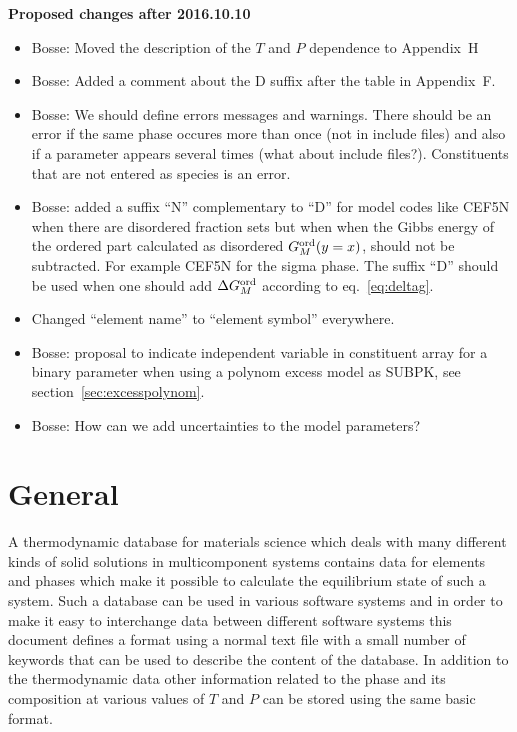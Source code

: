 \documentclass[12pt]{article}
\begin{document}
{\Large \bf Proposed changes after 2016.10.10}
\begin{itemize}
\item Bosse: Moved the description of the $T$ and $P$ dependence to
  Appendix~H
\item Bosse: Added a comment about the D suffix after the table in
  Appendix~F.
\item Bosse: We should define errors messages and warnings.  There
  should be an error if the same phase occures more than once (not in
  include files) and also if a parameter appears several times (what
  about include files?).  Constituents that are not entered as species
  is an error.
\item Bosse: added a suffix ``N'' complementary to ``D'' for model
  codes like CEF5N when there are disordered fraction sets but when
  when the Gibbs energy of the ordered part calculated as disordered
  $G^{\rm ord}_M(y=x)$, should not be subtracted.  For example CEF5N
  for the sigma phase.  The suffix ``D'' should be used when one
  should add $\Delta G^{\rm ord}_M$ according to eq.~\ref{eq:deltag}.
\item Changed ``element name'' to ``element symbol'' everywhere.
\item Bosse: proposal to indicate independent variable in constituent
  array for a binary parameter when using a polynom excess model as
  SUBPK, see section~\ref{sec:excesspolynom}.
\item Bosse: How can we add uncertainties to the model parameters?
\end{itemize}

\newpage

\tableofcontents

\newpage

\section{General}

A thermodynamic database for materials science which deals with many
different kinds of solid solutions in multicomponent systems contains
data for elements and phases which make it possible to calculate the
equilibrium state of such a system.  Such a database can be used in
various software systems and in order to make it easy to interchange
data between different software systems this document defines a format
using a normal text file with a small number of keywords that can be
used to describe the content of the database.  In addition to the
thermodynamic data other information related to the phase and its
composition at various values of $T$ and $P$ can be stored using the
same basic format.
\end{document}
